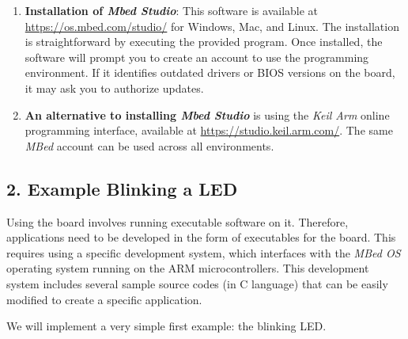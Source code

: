 \documentclass[10pt,a4paper,onecolumn]{article}
\begin{document}
\begin{enumerate}
  \item \textbf{Installation of \textit{Mbed Studio}}: This software is available at \url{https://os.mbed.com/studio/} for Windows, Mac, and Linux. The installation is straightforward by executing the provided program. Once installed, the software will prompt you to create an account to use the programming environment. If it identifies outdated drivers or BIOS versions on the board, it may ask you to authorize updates.

  \item \textbf{An alternative to installing \textit{Mbed Studio}} is using the \textit{Keil Arm} online programming interface, available at \url{https://studio.keil.arm.com/}. The same \textit{MBed} account can be used across all environments.
\end{enumerate}

\hypertarget{example-blinking-a-led}{%
\subsection{2. Example Blinking a LED}\label{example-blinking-a-led}}

Using the board involves running executable software on it. Therefore, applications need to be developed in the form of executables for the board. This requires using a specific development system, which interfaces with the \textit{MBed OS} operating system running on the ARM microcontrollers. This development system includes several sample source codes (in C language) that can be easily modified to create a specific application.

We will implement a very simple first example: the blinking LED.
\end{document}
